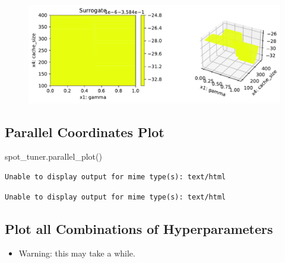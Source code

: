 \documentclass[
  letterpaper,
  DIV=11,
  numbers=noendperiod]{scrreprt}
\newenvironment{Shaded}{\begin{snugshade}}{\end{snugshade}}
\newcommand{\NormalTok}[1]{\textcolor[rgb]{0.00,0.23,0.31}{#1}}
\providecommand{\tightlist}{%
  \setlength{\itemsep}{0pt}\setlength{\parskip}{0pt}}\usepackage{longtable,booktabs,array}
\begin{document}
\begin{figure}[H]

{\centering \includegraphics{18_spot_hpt_sklearn_multiclass_classification_svc_files/figure-pdf/cell-47-output-4.pdf}

}

\end{figure}

\hypertarget{parallel-coordinates-plot-3}{%
\subsection{Parallel Coordinates
Plot}\label{parallel-coordinates-plot-3}}

\begin{Shaded}
\begin{Highlighting}[]
\NormalTok{spot\_tuner.parallel\_plot()}
\end{Highlighting}
\end{Shaded}

\begin{verbatim}
Unable to display output for mime type(s): text/html
\end{verbatim}

\begin{verbatim}
Unable to display output for mime type(s): text/html
\end{verbatim}

\hypertarget{plot-all-combinations-of-hyperparameters-4}{%
\subsection{Plot all Combinations of
Hyperparameters}\label{plot-all-combinations-of-hyperparameters-4}}

\begin{itemize}
\tightlist
\item
  Warning: this may take a while.
\end{itemize}
\end{document}
